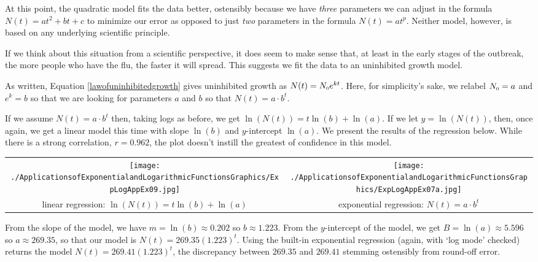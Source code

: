\documentclass{ximera}
\begin{document}
At this point, the quadratic model fits the data better, ostensibly because we have \textit{three} parameters we can adjust in the formula $N(t) = at^2+bt+c$ to minimize our error as opposed to just \textit{two} parameters in the formula $N(t) = a t^{p}$.  Neither  model, however, is based on any underlying scientific principle.

\smallskip

If we think about this situation from a scientific perspective, it does seem to make sense that, at least in the early stages of the outbreak, the more people who have the flu, the faster it will spread.  This suggests we fit the data to an uninhibited growth model.

\smallskip

As  written,  Equation \ref{lawofuninhibitedgrowth} gives uninhibited growth as  $N(t) = N_{\mbox{\tiny$0$}}e^{kt}$. Here, for simplicity's sake, we relabel $N_{\mbox{\tiny$0$}} = a$ and $e^{k} = b$ so that we are looking for parameters $a$ and $b$ so that $N(t) = a \cdot b^{t}$.

\smallskip

\label{swineflulinearized}
If we assume $N(t) = a \cdot b^{t}$ then, taking logs as before, we get $\ln(N(t)) = t \ln(b) + \ln(a)$. If we let $y= \ln(N(t))$, then, once again, we get a linear model this time with slope $\ln(b)$ and $y$-intercept $\ln(a)$.  We present the results of the regression below.  While there is a strong correlation, $r = 0.962$, the plot doesn't instill the greatest of confidence in this model.

\begin{center}

\begin{tabular}{cc}

\texttt{[image: ./ApplicationsofExponentialandLogarithmicFunctionsGraphics/ExpLogAppEx09.jpg]} &

\texttt{[image: ./ApplicationsofExponentialandLogarithmicFunctionsGraphics/ExpLogAppEx07a.jpg]} \\

linear regression: $\ln(N(t)) = t \ln(b) + \ln(a)$ &

exponential regression: $N(t) = a \cdot b^{t}$ \\

\end{tabular}

\end{center}

From the slope of the model, we have   $m = \ln(b) \approx 0.202$  so $b \approx 1.223$.  From the $y$-intercept of the model, we get $B = \ln(a) \approx  5.596$ so $a \approx 269.35$, so that our model is $N(t) = 269.35(1.223)^{t}$. Using the built-in exponential regression (again, with `log mode' checked) returns the model  $N(t) = 269.41 (1.223)^{t}$, the discrepancy between   $269.35$ and $269.41$ stemming ostensibly from round-off error.    
\end{document}
